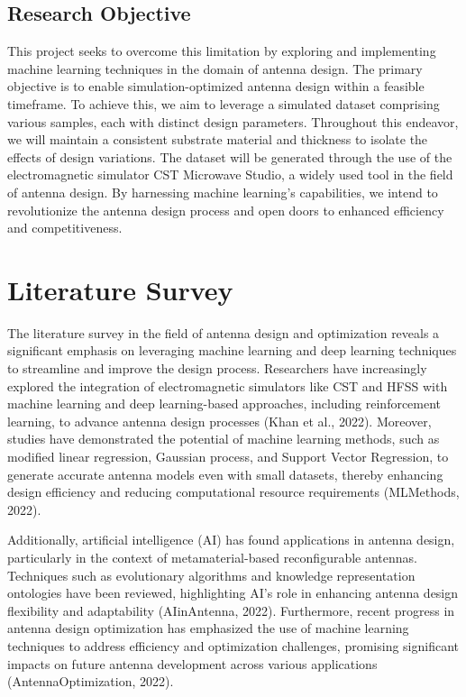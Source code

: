 \documentclass[a4paper,12pt]{report}
\begin{document}
\section{Research Objective}
This project seeks to overcome this limitation by exploring and implementing machine learning techniques in the domain of antenna design. The primary objective is to enable simulation-optimized antenna design within a feasible timeframe. To achieve this, we aim to leverage a simulated dataset comprising various samples, each with distinct design parameters. Throughout this endeavor, we will maintain a consistent substrate material and thickness to isolate the effects of design variations. The dataset will be generated through the use of the electromagnetic simulator CST Microwave Studio, a widely used tool in the field of antenna design. By harnessing machine learning's capabilities, we intend to revolutionize the antenna design process and open doors to enhanced efficiency and competitiveness.

\chapter{Literature Survey}
\label{sec:literature_survey}

The literature survey in the field of antenna design and optimization reveals a significant emphasis on leveraging machine learning and deep learning techniques to streamline and improve the design process. Researchers have increasingly explored the integration of electromagnetic simulators like CST and HFSS with machine learning and deep learning-based approaches, including reinforcement learning, to advance antenna design processes (Khan et al., 2022). Moreover, studies have demonstrated the potential of machine learning methods, such as modified linear regression, Gaussian process, and Support Vector Regression, to generate accurate antenna models even with small datasets, thereby enhancing design efficiency and reducing computational resource requirements (MLMethods, 2022).

Additionally, artificial intelligence (AI) has found applications in antenna design, particularly in the context of metamaterial-based reconfigurable antennas. Techniques such as evolutionary algorithms and knowledge representation ontologies have been reviewed, highlighting AI's role in enhancing antenna design flexibility and adaptability (AIinAntenna, 2022). Furthermore, recent progress in antenna design optimization has emphasized the use of machine learning techniques to address efficiency and optimization challenges, promising significant impacts on future antenna development across various applications (AntennaOptimization, 2022).
\end{document}
